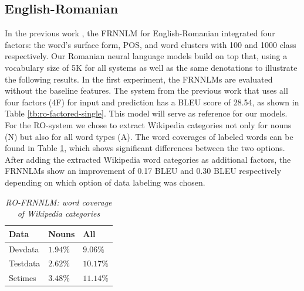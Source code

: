 \documentclass[a4paper]{article}
\begin{document}
\subsection{English-Romanian}
In the previous work \cite{niehuesusing}, the FRNNLM for English-Romanian integrated four factors: the word's surface form, POS, and word clusters with 100 and 1000 class respectively. Our Romanian neural language models build on top that, using a vocabulary size of 5K for all systems as well as the same denotations to illustrate the following results. In the first experiment, the FRNNLMs are evaluated without the baseline features. The system from the previous work that uses all four factors (4F) for input and prediction has a BLEU score of 28.54, as shown in Table \ref{tb:ro-factored-single}. This model will serve as reference for our models. For the RO-system we chose to extract Wikipedia categories not only for nouns (N) but also for all word types (A). The word coverages of labeled words can be found in Table \ref{tb:ro-word-coverage}, which shows significant differences between the two options.
After adding the extracted Wikipedia word categories as additional factors, the FRNNLMs show an improvement of 0.17 BLEU and 0.30 BLEU respectively depending on which option of data labeling was chosen.

\begin{table}
\caption{\it RO-FRNNLM: word coverage of Wikipedia categories}
\vspace{2mm}
\centering
  \begin{tabular}{lll}
  	\hline
  	Data     & Nouns     & All        \\ \hline\hline
  	Devdata  & $1.94 \%$ & $9.06 \%$  \\
  	Testdata & $2.62 \%$ & $10.17 \%$ \\ \hline
  	Setimes  & $3.48 \%$ & $11.14 \%$
  \end{tabular}
  \label{tb:ro-word-coverage}
\end{table}

\end{document}
